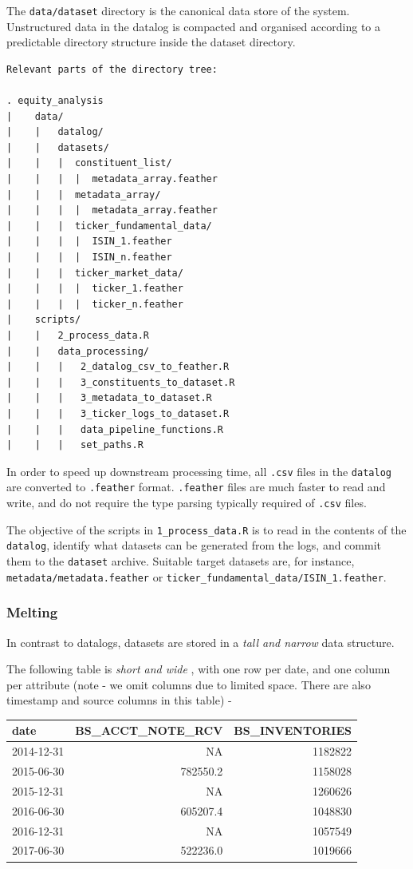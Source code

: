 \documentclass[11pt,preprint, authoryear]{elsarticle}
\numberwithin{equation}{section}
\numberwithin{figure}{section}
\numberwithin{table}{section}
\begin{document}
The \texttt{data/dataset} directory is the canonical data store of the
system. Unstructured data in the datalog is compacted and organised
according to a predictable directory structure inside the dataset
directory.

\begin{verbatim}
Relevant parts of the directory tree: 

. equity_analysis
|    data/
|    |   datalog/
|    |   datasets/
|    |   |  constituent_list/
|    |   |  |  metadata_array.feather
|    |   |  metadata_array/
|    |   |  |  metadata_array.feather
|    |   |  ticker_fundamental_data/
|    |   |  |  ISIN_1.feather
|    |   |  |  ISIN_n.feather
|    |   |  ticker_market_data/
|    |   |  |  ticker_1.feather
|    |   |  |  ticker_n.feather
|    scripts/
|    |   2_process_data.R
|    |   data_processing/
|    |   |   2_datalog_csv_to_feather.R
|    |   |   3_constituents_to_dataset.R
|    |   |   3_metadata_to_dataset.R
|    |   |   3_ticker_logs_to_dataset.R
|    |   |   data_pipeline_functions.R
|    |   |   set_paths.R
\end{verbatim}

In order to speed up downstream processing time, all \texttt{.csv} files
in the \texttt{datalog} are converted to \texttt{.feather} format.
\texttt{.feather} files are much faster to read and write, and do not
require the type parsing typically required of \texttt{.csv} files.

The objective of the scripts in \texttt{1\_process\_data.R} is to read
in the contents of the \texttt{datalog}, identify what datasets can be
generated from the logs, and commit them to the \texttt{dataset}
archive. Suitable target datasets are, for instance,
\texttt{metadata/metadata.feather} or
\texttt{ticker\_fundamental\_data/ISIN\_1.feather}.

\subsubsection{Melting}\label{melting}

In contrast to datalogs, datasets are stored in a \emph{tall and narrow}
data structure.

The following table is \emph{short and wide} , with one row per date,
and one column per attribute (note - we omit columns due to limited
space. There are also timestamp and source columns in this table) -

\begin{longtable}[]{@{}lrr@{}}
\toprule
date & BS\_ACCT\_NOTE\_RCV & BS\_INVENTORIES\tabularnewline
\midrule
\endhead
2014-12-31 & NA & 1182822\tabularnewline
2015-06-30 & 782550.2 & 1158028\tabularnewline
2015-12-31 & NA & 1260626\tabularnewline
2016-06-30 & 605207.4 & 1048830\tabularnewline
2016-12-31 & NA & 1057549\tabularnewline
2017-06-30 & 522236.0 & 1019666\tabularnewline
\bottomrule
\end{longtable}
\end{document}
